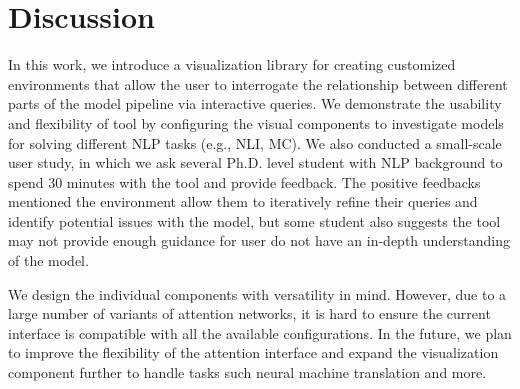 \section{Discussion}
In this work, we introduce a visualization library for creating customized environments that allow the user to interrogate the relationship between different parts of the model pipeline via interactive queries.
%
We demonstrate the usability and flexibility of tool by configuring the visual components to investigate models for solving different NLP tasks (e.g., NLI, MC).
%
We also conducted a small-scale user study, in which we ask several Ph.D. level student with NLP background to spend 30 minutes with the tool and provide feedback. The positive feedbacks mentioned the environment allow them to iteratively refine their queries and identify potential issues with the model, but some student also suggests the tool may not provide enough guidance for user do not have an in-depth understanding of the model.

We design the individual components with versatility in mind. However, due to a large number of variants of attention networks, it is hard to ensure the current interface is compatible with all the available configurations.
%
In the future, we plan to improve the flexibility of the attention interface and expand the visualization component further to handle tasks such neural machine translation and more. 
